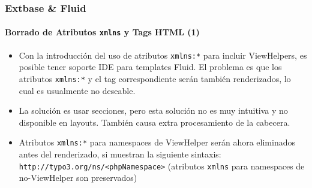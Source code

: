 \begin{frame}[fragile]
	\frametitle{Extbase \& Fluid}
	\framesubtitle{Borrado de Atributos \texttt{xmlns} y Tags HTML (1)}

	\lstset{basicstyle=\tiny\ttfamily}

	\begin{itemize}

		\item Con la introducción del uso de atributos \texttt{xmlns:*} para incluir
			ViewHelpers, es posible tener soporte IDE para templates Fluid.
			El problema es que los atributos \texttt{xmlns:*} y el tag correspondiente
			serán también renderizados, lo cual es usualmente no deseable.

		\item La solución es usar secciones, pero esta solución no es muy intuitiva
			y no disponible en layouts. También causa extra procesamiento de la cabecera.

		\item Atributos \texttt{xmlns:*} para namespaces de ViewHelper serán ahora
			eliminados antes del renderizado, si muestran la siguiente sintaxis:
			\small\texttt{http://typo3.org/ns/<phpNamespace>}\normalsize\newline
			(atributos \texttt{xmlns} para namespaces de no-ViewHelper son preservados)

	\end{itemize}

\end{frame}


